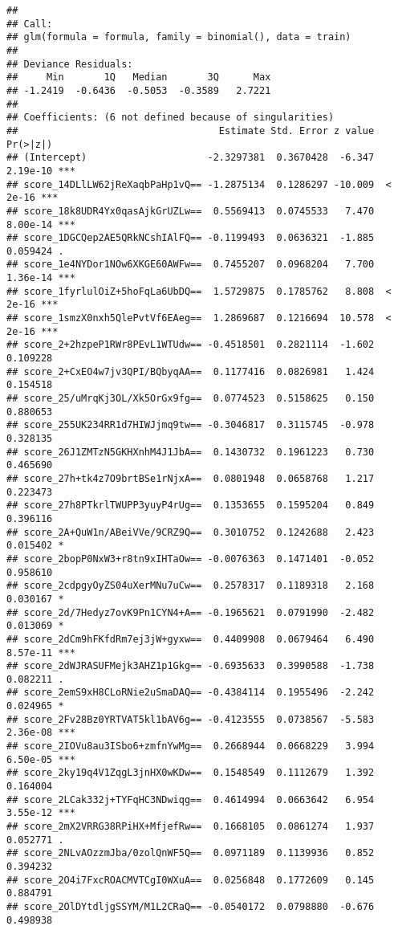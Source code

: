 \documentclass[]{article}
\begin{document}
\begin{verbatim}
## 
## Call:
## glm(formula = formula, family = binomial(), data = train)
## 
## Deviance Residuals: 
##     Min       1Q   Median       3Q      Max  
## -1.2419  -0.6436  -0.5053  -0.3589   2.7221  
## 
## Coefficients: (6 not defined because of singularities)
##                                   Estimate Std. Error z value Pr(>|z|)    
## (Intercept)                     -2.3297381  0.3670428  -6.347 2.19e-10 ***
## score_14DLlLW62jReXaqbPaHp1vQ== -1.2875134  0.1286297 -10.009  < 2e-16 ***
## score_18k8UDR4Yx0qasAjkGrUZLw==  0.5569413  0.0745533   7.470 8.00e-14 ***
## score_1DGCQep2AE5QRkNCshIAlFQ== -0.1199493  0.0636321  -1.885 0.059424 .  
## score_1e4NYDor1NOw6XKGE60AWFw==  0.7455207  0.0968204   7.700 1.36e-14 ***
## score_1fyrlulOiZ+5hoFqLa6UbDQ==  1.5729875  0.1785762   8.808  < 2e-16 ***
## score_1smzX0nxh5QlePvtVf6EAeg==  1.2869687  0.1216694  10.578  < 2e-16 ***
## score_2+2hzpeP1RWr8PEvL1WTUdw== -0.4518501  0.2821114  -1.602 0.109228    
## score_2+CxEO4w7jv3QPI/BQbyqAA==  0.1177416  0.0826981   1.424 0.154518    
## score_25/uMrqKj3OL/Xk5OrGx9fg==  0.0774523  0.5158625   0.150 0.880653    
## score_255UK234RR1d7HIWJjmq9tw== -0.3046817  0.3115745  -0.978 0.328135    
## score_26J1ZMTzN5GKHXnhM4J1JbA==  0.1430732  0.1961223   0.730 0.465690    
## score_27h+tk4z7O9brtBSe1rNjxA==  0.0801948  0.0658768   1.217 0.223473    
## score_27h8PTkrlTWUPP3yuyP4rUg==  0.1353655  0.1595204   0.849 0.396116    
## score_2A+QuW1n/ABeiVVe/9CRZ9Q==  0.3010752  0.1242688   2.423 0.015402 *  
## score_2bopP0NxW3+r8tn9xIHTaOw== -0.0076363  0.1471401  -0.052 0.958610    
## score_2cdpgyOyZS04uXerMNu7uCw==  0.2578317  0.1189318   2.168 0.030167 *  
## score_2d/7Hedyz7ovK9Pn1CYN4+A== -0.1965621  0.0791990  -2.482 0.013069 *  
## score_2dCm9hFKfdRm7ej3jW+gyxw==  0.4409908  0.0679464   6.490 8.57e-11 ***
## score_2dWJRASUFMejk3AHZ1p1Gkg== -0.6935633  0.3990588  -1.738 0.082211 .  
## score_2emS9xH8CLoRNie2uSmaDAQ== -0.4384114  0.1955496  -2.242 0.024965 *  
## score_2Fv28Bz0YRTVAT5kl1bAV6g== -0.4123555  0.0738567  -5.583 2.36e-08 ***
## score_2IOVu8au3ISbo6+zmfnYwMg==  0.2668944  0.0668229   3.994 6.50e-05 ***
## score_2ky19q4V1ZqgL3jnHX0wKDw==  0.1548549  0.1112679   1.392 0.164004    
## score_2LCak332j+TYFqHC3NDwiqg==  0.4614994  0.0663642   6.954 3.55e-12 ***
## score_2mX2VRRG38RPiHX+MfjefRw==  0.1668105  0.0861274   1.937 0.052771 .  
## score_2NLvAOzzmJba/0zolQnWF5Q==  0.0971189  0.1139936   0.852 0.394232    
## score_2O4i7FxcROACMVTCgI0WXuA==  0.0256848  0.1772609   0.145 0.884791    
## score_2OlDYtdljgSSYM/M1L2CRaQ== -0.0540172  0.0798880  -0.676 0.498938    

\end{verbatim}
\end{document}
